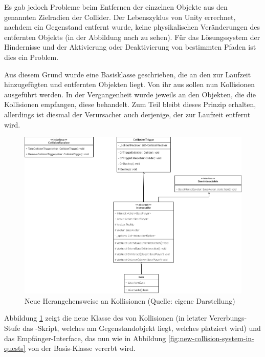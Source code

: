 Es gab jedoch Probleme beim Entfernen der einzelnen Objekte aus den genannten Zielradien der Collider. Der Lebenszyklus von Unity errechnet, nachdem ein Gegenstand entfernt wurde, keine physikalischen Veränderungen des entfernten Objekts (in der Abbildung nach  zu sehen). Für das Lösungssystem der Hindernisse und der Aktivierung oder Deaktivierung von bestimmten Pfaden ist dies ein Problem.

Aus diesem Grund wurde eine Basisklasse geschrieben, die an den zur Laufzeit hinzugefügten und entfernten Objekten liegt. Von ihr aus sollen nun Kollisionen ausgeführt werden. In der Vergangenheit wurde jeweils an den Objekten, die die Kollisionen empfangen, diese behandelt. Zum Teil bleibt dieses Prinzip erhalten, allerdings ist diesmal der Verursacher auch derjenige, der zur Laufzeit entfernt wird.

\begin{figure}[ht]
\centering
\includegraphics[width=1\linewidth]{content/pictures/CollisionSystem.drawio.png}
\caption{Neue Herangehensweise an Kollisionen (Quelle: eigene Darstellung)}
\label{fig:new-collision-system}
\end{figure}

Abbildung \ref{fig:new-collision-system} zeigt die neue Klasse des  von Kollisionen (in letzter Vererbungs-Stufe das -Skript, welches am Gegenstandobjekt liegt, welches platziert wird) und das Empfänger-Interface, das nun wie in Abbildung \ref{fig:new-collision-system-in-quests} von der  Basis-Klasse vererbt wird. 

